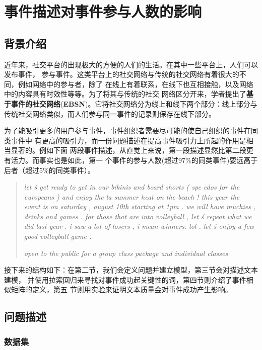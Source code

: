 
%    
\section{事件描述对事件参与人数的影响} 
\subsection{背景介绍}  
  近年来，社交平台的出现极大的方便的人们的生活。在其中一些平台上，人们可以发布事件，
参与事件。这类平台上的社交网络与传统的社交网络有着很大的不同，例如网络中的参与者，除了
在线上有着联系，在线下也互相接触，以及网络中的内容具有时效性等等。为了将其与传统的社交
网络区分开来，学者提出了\textbf{基于事件的社交网络}(\textbf{EBSN})\cite{EBSN_linking}。它将社交网络分为线上和线下两个部分：线上部分与传统社交网络类似，而人们参与同一事件的记录则保存在线下部分。
 
为了能吸引更多的用户参与事件，事件组织者需要尽可能的使自己组织的事件在同类事件中
有更高的吸引力，而一份问题描述在提高事件吸引力上所起的作用是相当显著的。例如下面
两段事件描述，从直觉上来说，第一段描述显然比第二段更有活力。而事实也是如此，第一
个事件的参与人数(超过97\%的同类事件)要远高于后者（超过5\%的同类事件）。
 
\begin{quotation}
  \textit{let  \'s get ready to get in our bikinis and board shorts  (  spe
  edos for the europeans  )  and enjoy the la summer heat on the beach
  !  this year the event is on saturday  ,  august 10th starting at 
  1pm . we will have muchies  ,  drinks and games . for those that 
  are into volleyball  ,  let  \'s repeat what we did last year . 
  i saw a lot of losers  ,  i mean winners. lol . let  \'s enjoy 
  a few good volleyball game . \\ 
  }
    
  \textit{open to the public for a group class package and individual classes}
\end{quotation}

接下来的结构如下：在第二节，我们会定义问题并建立模型，第三节会对描述文本建模，
并使用拉索回归来寻找对事件成功起关键性的词，第四节则介绍了事件相似矩阵的定义，第五
节则用实验来证明文本质量会对事件成功产生影响。

\subsection{问题描述}
\subsubsection{数据集}

